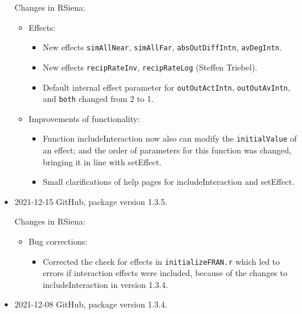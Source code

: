 \documentclass[a4paper,fleqn,11pt]{article}
\newcommand{\+}{\, + \,}
\newcommand{\sfn}[1]{\textsf{#1}}
\begin{document}
\begin{small}
\begin{itemize}
Changes in RSiena:
\begin{itemize}
\item  Effects:
\begin{itemize}
  \item New effects  \texttt{simAllNear}, \texttt{simAllFar}, \texttt{absOutDiffIntn}, \texttt{avDegIntn}.
  \item New effects \texttt{recipRateInv}, \texttt{recipRateLog} (Steffen Triebel).
  \item Default internal effect parameter for \texttt{outOutActIntn}, \texttt{outOutAvIntn},
    and \texttt{both} changed from 2 to 1.
\end{itemize}
\item Improvements of functionality:
\begin{itemize}
   \item Function \sfn{includeInteraction} now also can modify the \texttt{initialValue}
     of an effect; and the order of parameters for this function was changed,
     bringing it in line with \textsf{setEffect}.
   \item Small clarifications of help pages for \sfn{includeInteraction} and
     \textsf{setEffect}.
\end{itemize}

\end{itemize}

\item 2021-12-15 GitHub, package version 1.3.5.

Changes in RSiena:
\begin{itemize}
\item Bug corrections:
   \begin{itemize}
   \item Corrected the check for effects in  \texttt{initializeFRAN.r}
     which led to errors if interaction effects were included,
     because of the changes to \sfn{includeInteraction} in version 1.3.4.
    \end{itemize}
\end{itemize}


\item 2021-12-08 GitHub, package version 1.3.4.


\end{itemize}
\end{small}
\end{document}
